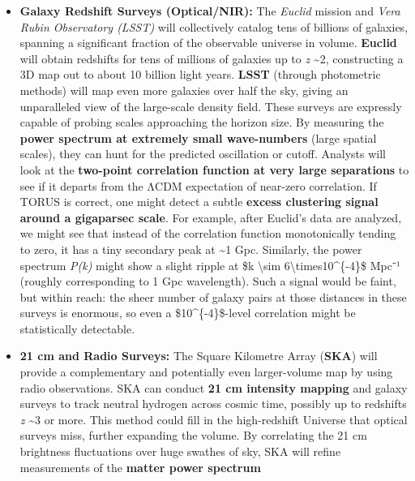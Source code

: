 \documentclass[
]{article}
\begin{document}
\begin{itemize}
\item
  \textbf{Galaxy Redshift Surveys (Optical/NIR):} The \emph{Euclid}
  mission and \emph{Vera Rubin Observatory (LSST)} will collectively
  catalog tens of billions of galaxies, spanning a significant fraction
  of the observable universe in volume. \textbf{Euclid} will obtain
  redshifts for tens of millions of galaxies up to \emph{z}
  \textasciitilde2, constructing a 3D map out to about 10 billion light
  years. \textbf{LSST} (through photometric methods) will map even more
  galaxies over half the sky, giving an unparalleled view of the
  large-scale density field. These surveys are expressly capable of
  probing scales approaching the horizon size. By measuring the
  \textbf{power spectrum at extremely small wave-numbers} (large spatial
  scales), they can hunt for the predicted oscillation or cutoff.
  Analysts will look at the \textbf{two-point correlation function at
  very large separations} to see if it departs from the ΛCDM expectation
  of near-zero correlation\hspace{0pt}. If TORUS is correct, one might
  detect a subtle \textbf{excess clustering signal around a gigaparsec
  scale}\hspace{0pt}. For example, after Euclid's data are analyzed, we
  might see that instead of the correlation function monotonically
  tending to zero, it has a tiny secondary peak at \textasciitilde1 Gpc.
  Similarly, the power spectrum \emph{P(k)} might show a slight ripple
  at \$k \textbackslash sim 6\textbackslash times10\^{}\{-4\}\$ Mpc⁻¹
  (roughly corresponding to 1 Gpc wavelength). Such a signal would be
  faint, but within reach: the sheer number of galaxy pairs at those
  distances in these surveys is enormous, so even a
  \$10\^{}\{-4\}\$-level correlation might be statistically
  detectable\hspace{0pt}.
\item
  \textbf{21 cm and Radio Surveys:} The Square Kilometre Array
  (\textbf{SKA}) will provide a complementary and potentially even
  larger-volume map by using radio observations. SKA can conduct
  \textbf{21 cm intensity mapping} and galaxy surveys to track neutral
  hydrogen across cosmic time, possibly up to redshifts \emph{z}
  \textasciitilde3 or more. This method could fill in the high-redshift
  Universe that optical surveys miss, further expanding the volume. By
  correlating the 21 cm brightness fluctuations over huge swathes of
  sky, SKA will refine measurements of the \textbf{matter power spectrum
}
\end{itemize}
\end{document}
